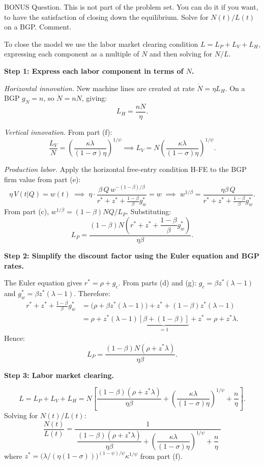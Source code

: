\documentclass[11pt]{exam}
\begin{document}
\begin{questions}
\question BONUS Question. This is not part of the problem set. You can do it if you want, to have the satisfaction of closing down the equilibrium. Solve for $N(t)/L(t)$ on a BGP. Comment.
\begin{solution}
To close the model we use the labor market clearing condition $L=L_{P}+L_{V}+L_{H}$, expressing each component as a multiple of $N$ and then solving for $N/L$.

\textbf{Step 1: Express each labor component in terms of $N$.}

\textit{Horizontal innovation.}  New machine lines are created at rate $\dot{N}=\eta L_{H}$.  On a BGP $g_{N}=n$, so $\dot{N}=nN$, giving:
\[
	L_{H} = \frac{nN}{\eta}.
\]

\textit{Vertical innovation.}  From part (f):
\[
	\frac{L_{V}}{N} = \left(\frac{\kappa\lambda}{(1-\sigma)\eta}\right)^{\!1/\psi}
	\implies L_{V} = N\!\left(\frac{\kappa\lambda}{(1-\sigma)\eta}\right)^{\!1/\psi}.
\]

\textit{Production labor.}  Apply the horizontal free-entry condition H-FE to the BGP firm value from part (e):
\[
	\eta\,V(t|Q)=w(t)
	\;\implies\;
	\eta\cdot\frac{\beta\,Q\,w^{-(1-\beta)/\beta}}{r^{*}+z^{*}+\frac{1-\beta}{\beta}g_{w}^{*}} = w
	\;\implies\;
	w^{1/\beta} = \frac{\eta\beta\,Q}{r^{*}+z^{*}+\frac{1-\beta}{\beta}g_{w}^{*}}.
\]
From part (c), $w^{1/\beta}=(1-\beta)NQ/L_{P}$.  Substituting:
\[
	L_{P} = \frac{(1-\beta)N\!\left(r^{*}+z^{*}+\dfrac{1-\beta}{\beta}g_{w}^{*}\right)}{\eta\beta}.
\]

\textbf{Step 2: Simplify the discount factor using the Euler equation and BGP rates.}

The Euler equation gives $r^{*}=\rho+g_{c}$.  From parts (d) and (g): $g_{c}=\beta z^{*}(\lambda-1)$ and $g_{w}^{*}=\beta z^{*}(\lambda-1)$.  Therefore:
\begin{align*}
	r^{*}+z^{*}+\frac{1-\beta}{\beta}g_{w}^{*}
	&= \bigl(\rho+\beta z^{*}(\lambda-1)\bigr)+z^{*}+(1-\beta)z^{*}(\lambda-1) \\
	&= \rho + z^{*}(\lambda-1)\underbrace{[\beta+(1-\beta)]}_{=1}+z^{*}
	= \rho + z^{*}\lambda.
\end{align*}
Hence:
\[
	L_{P} = \frac{(1-\beta)N(\rho+z^{*}\lambda)}{\eta\beta}.
\]

\textbf{Step 3: Labor market clearing.}

\[
	L = L_{P}+L_{V}+L_{H}
	= N\!\left[\frac{(1-\beta)(\rho+z^{*}\lambda)}{\eta\beta}
	+\left(\frac{\kappa\lambda}{(1-\sigma)\eta}\right)^{\!1/\psi}
	+\frac{n}{\eta}\right].
\]
Solving for $N(t)/L(t)$:
\[
	\boxed{\frac{N(t)}{L(t)}=\frac{1}{\;\dfrac{(1-\beta)(\rho+z^{*}\lambda)}{\eta\beta}
	+\left(\dfrac{\kappa\lambda}{(1-\sigma)\eta}\right)^{\!1/\psi}
	+\dfrac{n}{\eta}\;}}
\]
where $z^{*}=\bigl(\lambda/(\eta(1-\sigma))\bigr)^{(1-\psi)/\psi}\kappa^{1/\psi}$ from part (f).


\end{solution}
\end{questions}
\end{document}
